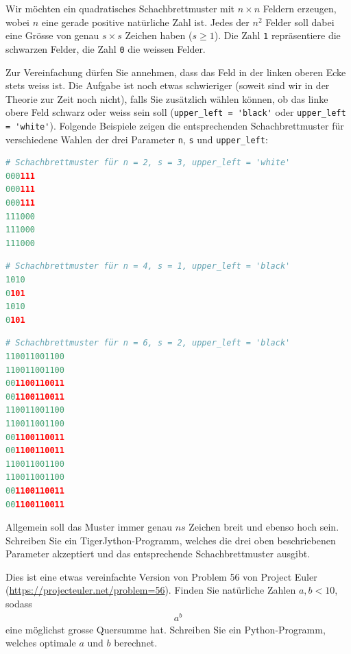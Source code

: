 \begin{mychallenge}[Schachbrettmuster]
	Wir möchten ein quadratisches Schachbrettmuster mit $n\times n$ Feldern erzeugen, wobei $n$ eine gerade positive natürliche Zahl ist.
	Jedes der $n^2$ Felder soll dabei eine Grösse von genau $s\times s$ Zeichen haben ($s\geq 1$). Die Zahl \lstinline|1| repräsentiere die schwarzen Felder, die Zahl \lstinline|0| die weissen Felder.

	Zur Vereinfachung dürfen Sie annehmen, dass das Feld in der linken oberen Ecke stets weiss ist. Die Aufgabe ist noch etwas schwieriger (soweit sind wir in der Theorie zur Zeit noch nicht), falls Sie zusätzlich wählen können, ob das linke obere Feld schwarz oder weiss sein soll (\lstinline|upper_left = 'black'| oder \lstinline|upper_left = 'white'|). Folgende Beispiele zeigen die entsprechenden Schachbrettmuster für verschiedene Wahlen der drei Parameter \lstinline|n|, \lstinline|s| und \lstinline|upper_left|:

	\begin{lstlisting}[language=Python]
# Schachbrettmuster für n = 2, s = 3, upper_left = 'white'
000111
000111
000111
111000
111000
111000
\end{lstlisting}

	\begin{lstlisting}[language=Python]
# Schachbrettmuster für n = 4, s = 1, upper_left = 'black'
1010
0101
1010
0101
\end{lstlisting}

	\begin{lstlisting}[language=Python]
# Schachbrettmuster für n = 6, s = 2, upper_left = 'black'
110011001100
110011001100
001100110011
001100110011
110011001100
110011001100
001100110011
001100110011
110011001100
110011001100
001100110011
001100110011
\end{lstlisting}
	Allgemein soll das Muster immer genau $ns$ Zeichen breit und ebenso hoch sein. Schreiben Sie ein TigerJython-Programm, welches die drei oben beschriebenen Parameter akzeptiert und das entsprechende Schachbrettmuster ausgibt.

	\begin{myanswer}
		
	\end{myanswer}
\end{mychallenge}

\begin{mychallenge}
	Dies ist eine etwas vereinfachte Version von Problem 56 von Project Euler (\url{https://projecteuler.net/problem=56}). Finden Sie natürliche Zahlen $a, b < 10$, sodass
	\begin{align*}
		a^b
	\end{align*}
	eine möglichst grosse Quersumme hat. Schreiben Sie ein Python-Programm, welches optimale $a$ und $b$ berechnet.
	\begin{myanswer}
		
	\end{myanswer}
\end{mychallenge}